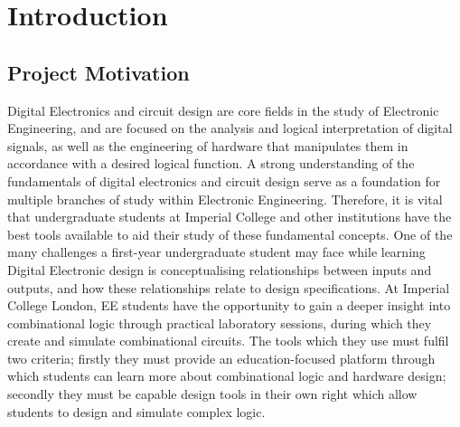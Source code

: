 \clearpage
{}

\chapter{Introduction} \label{chap:intro}

\section{Project Motivation}

Digital Electronics and circuit design are core fields in the study of Electronic Engineering, and are focused on the analysis and logical interpretation of digital signals, as well as the engineering of hardware that manipulates them in accordance with a desired logical function. A strong understanding of the fundamentals of digital electronics and circuit design serve as a foundation for multiple branches of study within Electronic Engineering. Therefore, it is vital that undergraduate students at Imperial College and other institutions have the best tools available to aid their study of these fundamental concepts.
One of the many challenges a first-year undergraduate student may face while learning Digital Electronic design is conceptualising relationships between inputs and outputs, and how these relationships relate to design specifications. At Imperial College London, EE students have the opportunity to gain a deeper insight into combinational logic through practical laboratory sessions, during which they create and simulate combinational circuits. The tools which they use must fulfil two criteria; firstly they must provide an education-focused platform through which students can learn more about combinational logic and hardware design; secondly they must be capable design tools in their own right which allow students to design and simulate complex logic.

